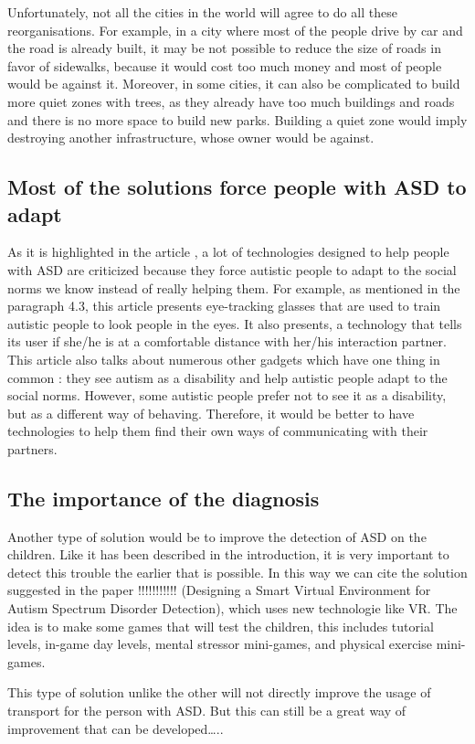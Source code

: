 Unfortunately, not all the cities in the world will agree to do all these reorganisations. For example, in a city where most of the people drive by car and the road is already built, it may be not possible to reduce the size of roads in favor of sidewalks, because it would cost too much money and most of people would be against it. Moreover, in some cities, it can also be complicated to build more quiet zones with trees, as they already have too much buildings and roads and there is no more space to build new parks. Building a quiet zone would imply destroying another infrastructure, whose owner would be against. 
\subsection{Most of the solutions force people with ASD to adapt}
As it is highlighted in the article \cite{2017UTravelSmartMobility}, a lot of technologies designed to help people with ASD are criticized because they force autistic people to adapt to the social norms we know instead of really helping them. For example, as mentioned in the paragraph 4.3, this article presents eye-tracking glasses that are used to train autistic people to look people in the eyes. It also presents, a technology that tells its user if she/he is at a comfortable distance with her/his interaction partner. This article also talks about numerous other gadgets which have one thing in common : they see autism as a disability and help autistic people adapt to the social norms. However, some autistic people prefer not to see it as a disability, but as a different way of behaving. Therefore, it would be better to have technologies to help them find their own ways of communicating with their partners. 

\subsection{The importance of the diagnosis}
Another type of solution would be to improve the detection of ASD on the children. Like it has been described in the introduction, it is very important to detect this trouble the earlier that is possible. In this way we can cite the solution suggested in the paper !!!!!!!!!!! (Designing a Smart Virtual Environment for Autism Spectrum Disorder Detection), which uses new technologie like VR. The idea is to make some games that will test the children, this includes tutorial levels, in-game day levels, mental stressor mini-games, and physical exercise mini-games. 

This type of solution unlike the other will not directly improve the usage of transport for the person with ASD. But this can still be a great way of improvement that can be developed….. 
